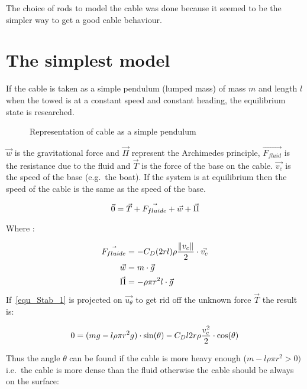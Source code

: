 The choice of rods to model the cable was done because it seemed to be the simpler
way to get a good cable behaviour.


\section{The simplest model}

If the cable is taken as a simple pendulum (lumped mass) of mass $m$ and length $l$ when the towed is at a constant speed 
and constant heading, the equilibrium state is researched.


\begin{figure}[H]
\centering
{} %
{

}
\caption{Representation of cable as a simple pendulum}
\label{fig:model_pendulum}
\end{figure}


$\vec{w}$ is the gravitational force and $\vec{\Pi}$ represent the Archimedes principle, $\vec{F_{fluid}}$ is the resistance due to the fluid and $\vec{T}$ is the force of the base on the cable. $\vec{v_c}$ is the speed of the base (e.g.\ the boat). If the system is at equilibrium then the speed of the cable is the same as the speed of the base. 

\begin{equation}
 \vec{0} = \vec{T}+\vec{F_{fluide}}+\vec{w}+\vec{\Pi}\\
 \label{equ_Stab_1}
\end{equation}


Where :


{
\begin{align}
\centering
\vec{F_{fluide}} &= -C_D (2 r l) \rho \frac{ \|v_c\|}{2} \cdot \vec{v_c} \\
\vec{w} &= m \cdot \vec{g} \\
\vec{\Pi} &= - \rho \pi r^2 l \cdot \vec{g}
\end{align}
}
If~\ref{equ_Stab_1} is projected on $\vec{u_{\theta}}$ to get rid off the unknown force $\vec{T}$ the result is:

\begin{equation}
 0 = (m g - l \rho \pi r^2 g) \cdot \sin(\theta)-C_D l 2 r \rho \frac{v_c^2}{2} \cdot \cos(\theta)\\
 \label{equ_Stab_2}
\end{equation}

Thus the angle $\theta$ can be found if the cable is more heavy enough ($m -l \rho \pi r^2 > 0)$ i.e.\ the cable is more dense than the fluid otherwise the cable should be always on the surface:

